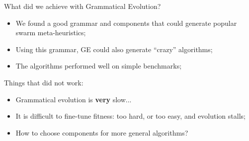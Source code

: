 \documentclass[aspectratio=169]{beamer}
\begin{document}
\begin{frame}{What did we achieve with Grammatical Evolution?}
  \begin{itemize}
  \item We found a good grammar and components that could generate popular swarm meta-heuristics;
  \item Using this grammar, GE could also generate ``crazy'' algorithms;
  \item The algorithms performed well on simple benchmarks;
  \end{itemize}
  \bigskip

  \alert{Things that did not work:}
  \begin{itemize}
  \item Grammatical evolution is {\bf very} slow...
  \item It is difficult to fine-tune fitness: too hard, or too easy, and evolution stalls;
  \item How to choose components for more general algorithms?
  \end{itemize}
\end{frame}

\end{document}
